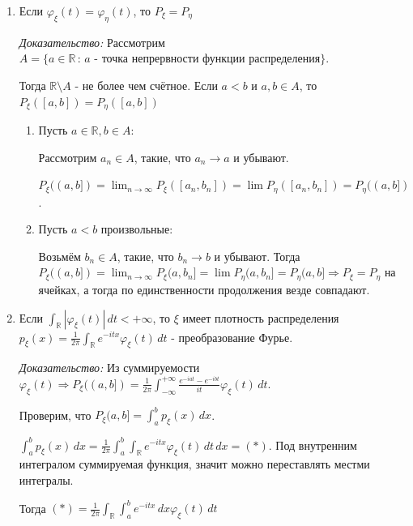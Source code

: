 \begin{consequence}
    \begin{enumerate}
        \item {
            Если $\varphi_{\xi}(t) = \varphi_{\eta}(t)$, то $P_{\xi} = P_\eta$

            \textit{Доказательство: } Рассмотрим $A = \{ a \in \mathbb{R} \, : \, \text{$a$ - точка непрервности функции распределения} \}$.

            Тогда $\mathbb{R} \setminus A$ - не более чем счётное.
            Если $a < b$ и $a, b \in A$, то $P_{\xi} ([a, b]) = P_\eta ([a, b])$

            \begin{enumerate}
                \item {
                    Пусть $a \in \mathbb{R}, b \in A$:

                    Рассмотрим $a_n \in A$, такие, что $a_n \to a$ и убывают.

                    $P_{\xi} ((a, b]) = \lim_{n \to \infty} P_{\xi} ([a_n, b_n]) = \lim P_{\eta} ([a_n, b_n]) = P_\eta ((a, b])$.
                }
                \item {
                    Пусть $a < b$ произвольные:

                    Возьмём $b_n \in A$, такие, что $b_n \to b$ и убывают. Тогда $P_{\xi} ((a, b]) = \lim_{n \to \infty} P_{\xi} (a, b_n] = \lim P_\eta (a, b_n] = P_\eta (a, b] \Rightarrow
                    P_\xi = P_\eta$ на ячейках, а тогда по единственности продолжения везде совпадают.
                }
            \end{enumerate}
        }

        \item {
            Если $\int_{\mathbb{R}} |\varphi_\xi (t) | \, dt < +\infty$, то $\xi$ имеет плотность распределения
            $p_{\xi} (x) = \frac{1}{2\pi} \int_{\mathbb{R}} e^{-itx} \varphi_{\xi} (t) \, dt$ - преобразование Фурье.

            \textit{Доказательство: } Из суммируемости $\varphi_\xi (t) \Rightarrow P_{\xi} ((a, b]) = \frac{1}{2\pi} \int_{-\infty}^{+\infty} \frac{e^{-iat} - e^{-ibt}}{it} \varphi_{\xi} (t) \, dt$.

            Проверим, что $P_{\xi} (a, b] = \int_a^b p_{\xi} (x) \, dx$.

            $\int_a^b p_{\xi} (x) \, dx = \frac{1}{2\pi} \int_a^b \int_{\mathbb{R}} e^{-itx} \varphi_\xi (t) \, dt \, dx = (*)$. Под внутренним интегралом суммируемая функция, значит можно переставлять местми интегралы.

            Тогда $(*) = \frac{1}{2\pi} \int_{\mathbb{R}} \int_a^b e^{-itx} \, dx \varphi_\xi (t) \, dt$
        }
    \end{enumerate}
\end{consequence}

